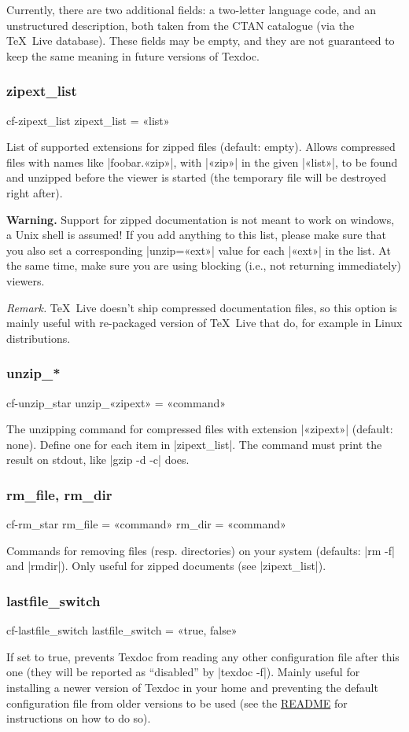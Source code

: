 \documentclass[a4paper,oneside]{scrartcl}
\newcommand\texlive{\TeX~Live\xspace}
\newif\ifframed
\newenvironment{cmdsubsub}[2]
  {\framedfalse \commandes\subsubsection{#1}{#2}}
  {\endcommandes}
\begin{document}
Currently, there are two additional fields: a two-letter language code, and an
unstructured description, both taken from the CTAN catalogue (via the \texlive
database). These fields may be empty, and they are not guaranteed to keep the
same meaning in future versions of Texdoc.

\begin{cmdsubsub}{zipext_list}{cf-zipext_list}
  zipext_list = «list»
\end{cmdsubsub}

List of supported extensions for zipped files (default: empty). Allows
compressed files with names like |foobar.«zip»|, with |«zip»| in the given
|«list»|, to be found and unzipped before the viewer is started (the
temporary file will be destroyed right after).

\textbf{Warning.} Support for zipped documentation is not meant to work on
windows, a Unix shell is assumed! If you add anything to this list, please make
sure that you also set a corresponding |unzip=«ext»| value for each |«ext»| in
the list. At the same time, make sure you are using blocking (i.e., not
returning immediately) viewers.

\textit{Remark.} \texlive doesn't ship compressed documentation files, so
this option is mainly useful with re-packaged version of \texlive that do,
for example in Linux distributions.

\begin{cmdsubsub}{unzip_*}{cf-unzip_star}
  unzip_«zipext» = «command»
\end{cmdsubsub}

The unzipping command for compressed files with extension |«zipext»| (default:
none). Define one for each item in |zipext_list|. The command must print
the result on stdout, like |gzip -d -c| does.

\begin{cmdsubsub}{rm_file, rm_dir}{cf-rm_star}
  rm_file = «command»
  rm_dir  = «command»
\end{cmdsubsub}

Commands for removing files (resp. directories) on your system (defaults:
|rm -f| and |rmdir|). Only useful for zipped documents (see |zipext_list|).

\begin{cmdsubsub}{lastfile_switch}{cf-lastfile_switch}
  lastfile_switch = «true, false»
\end{cmdsubsub}

If set to true, prevents Texdoc from reading any other configuration file after
this one (they will be reported as ``disabled'' by |texdoc -f|). Mainly useful
for installing a newer version of Texdoc in your home and preventing the
default configuration file from older versions to be used (see the
\href{https://github.com/TeX-Live/texdoc}{README} for instructions on how to do
so).
\end{document}
